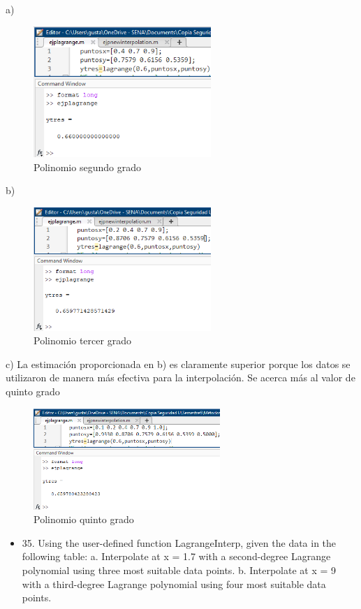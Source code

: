 \documentclass{article}
\begin{document}
a)
\begin{figure}[H]
    \centering
    \includegraphics[width=0.6\textwidth]{34a.png}
    \caption[short]{Polinomio segundo grado}
\end{figure}
b)
\begin{figure}[H]
    \centering
    \includegraphics[width=0.6\textwidth]{34b.png}
    \caption[short]{Polinomio tercer grado}
\end{figure}
c) La estimación proporcionada en b) es claramente superior porque los datos se utilizaron de manera más efectiva para la interpolación. Se acerca más al valor de quinto grado 
\begin{figure}[H]
    \centering
    \includegraphics[width=0.63\textwidth]{34c.png}
    \caption[short]{Polinomio quinto grado}
\end{figure}
\newpage 
\begin{itemize}
    \item 35. Using the user-defined function LagrangeInterp, given the
          data in the following table:
          \newline   a. Interpolate at x = 1.7 with a second-degree Lagrange polynomial
          using three most suitable data points.
          \newline b. Interpolate at x = 9 with a third-degree Lagrange polynomial
          using four most suitable data points.
\end{itemize}
\end{document}
